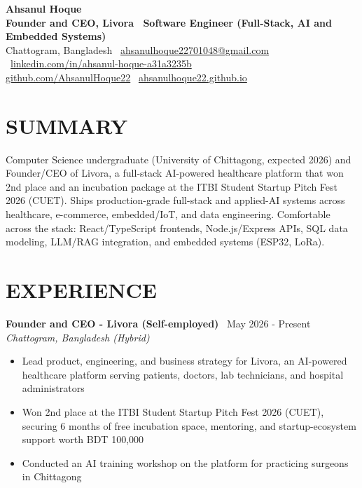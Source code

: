 \documentclass[10.5pt,a4paper]{article}
\newenvironment{tightitemize}{
  \begin{itemize}[leftmargin=15pt, itemsep=1pt, parsep=0pt, topsep=2pt]
}{
  \end{itemize}
}
\newcommand{\entry}[3]{%
  \textbf{#1} \textbar\ #2\\
  \textit{#3}%
}
\begin{document}
{\huge \bfseries Ahsanul Hoque}\\[2pt]
{\bfseries Founder and CEO, Livora \textbar\ Software Engineer (Full-Stack, AI and Embedded Systems)}\\[5pt]
{\small
  Chattogram, Bangladesh \textbar\
  \href{mailto:ahsanulhoque22701048@gmail.com}{ahsanulhoque22701048@gmail.com} \textbar\
  \href{https://linkedin.com/in/ahsanul-hoque-a31a3235b}{linkedin.com/in/ahsanul-hoque-a31a3235b} \textbar\\
  \href{https://github.com/AhsanulHoque22}{github.com/AhsanulHoque22} \textbar\
  \href{https://ahsanulhoque22.github.io}{ahsanulhoque22.github.io}
}

\section*{SUMMARY}
Computer Science undergraduate (University of Chittagong, expected 2026) and Founder/CEO of Livora, a full-stack AI-powered healthcare platform that won 2nd place and an incubation package at the ITBI Student Startup Pitch Fest 2026 (CUET). Ships production-grade full-stack and applied-AI systems across healthcare, e-commerce, embedded/IoT, and data engineering. Comfortable across the stack: React/TypeScript frontends, Node.js/Express APIs, SQL data modeling, LLM/RAG integration, and embedded systems (ESP32, LoRa).

\section*{EXPERIENCE}

\entry{Founder and CEO - Livora (Self-employed)}{May 2026 - Present}{Chattogram, Bangladesh (Hybrid)}
\begin{tightitemize}
  \item Lead product, engineering, and business strategy for Livora, an AI-powered healthcare platform serving patients, doctors, lab technicians, and hospital administrators
  \item Won 2nd place at the ITBI Student Startup Pitch Fest 2026 (CUET), securing 6 months of free incubation space, mentoring, and startup-ecosystem support worth BDT 100,000
  \item Conducted an AI training workshop on the platform for practicing surgeons in Chittagong
\end{tightitemize}

\end{document}
